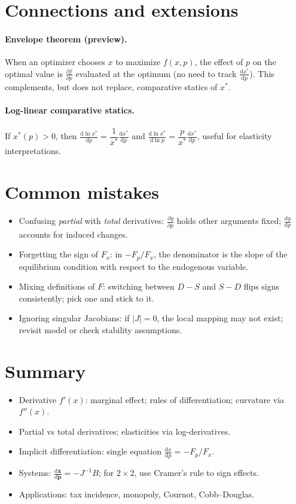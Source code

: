 \documentclass[11pt]{article}
\newcommand{\ve}[1]{\mathbf{#1}}
\newcommand{\pd}[2]{\frac{\partial #1}{\partial #2}}
\newcommand{\dtotal}[2]{\frac{\mathrm{d} #1}{\mathrm{d} #2}}
\begin{document}
\section{Connections and extensions}
\paragraph{Envelope theorem (preview).} When an optimizer chooses \(x\) to maximize \(f(x,p)\), the effect of \(p\) on the optimal value is \(\pd{f}{p}\) evaluated at the optimum (no need to track \(\dtotal{x^\ast}{p}\)). This complements, but does not replace, comparative statics of \(x^\ast\).

\paragraph{Log-linear comparative statics.} If \(x^\ast(p)\!>\!0\), then \(\dtotal{\ln x^\ast}{p}=\dfrac{1}{x^\ast}\dtotal{x^\ast}{p}\) and \(\dtotal{\ln x^\ast}{\ln p}=\dfrac{p}{x^\ast}\dtotal{x^\ast}{p}\), useful for elasticity interpretations.

\section{Common mistakes}
\begin{itemize}
  \item Confusing \emph{partial} with \emph{total} derivatives: \(\pd{y}{p}\) holds other arguments fixed; \(\dtotal{y}{p}\) accounts for induced changes.
  \item Forgetting the sign of \(F_x\): in \(-F_p/F_x\), the denominator is the slope of the equilibrium condition with respect to the endogenous variable.
  \item Mixing definitions of \(F\): switching between \(D-S\) and \(S-D\) flips signs consistently; pick one and stick to it.
  \item Ignoring singular Jacobians: if \(|J|=0\), the local mapping may not exist; revisit model or check stability assumptions.
\end{itemize}

\section*{Summary}
\begin{itemize}
  \item Derivative \(f'(x)\): marginal effect; rules of differentiation; curvature via \(f''(x)\).
  \item Partial vs total derivatives; elasticities via log-derivatives.
  \item Implicit differentiation: single equation \(\dtotal{x}{p}=-F_p/F_x\).
  \item Systems: \(\dtotal{\ve x}{\ve p}=-J^{-1}B\); for \(2\times 2\), use Cramer's rule to sign effects.
  \item Applications: tax incidence, monopoly, Cournot, Cobb--Douglas.
\end{itemize}
\end{document}
